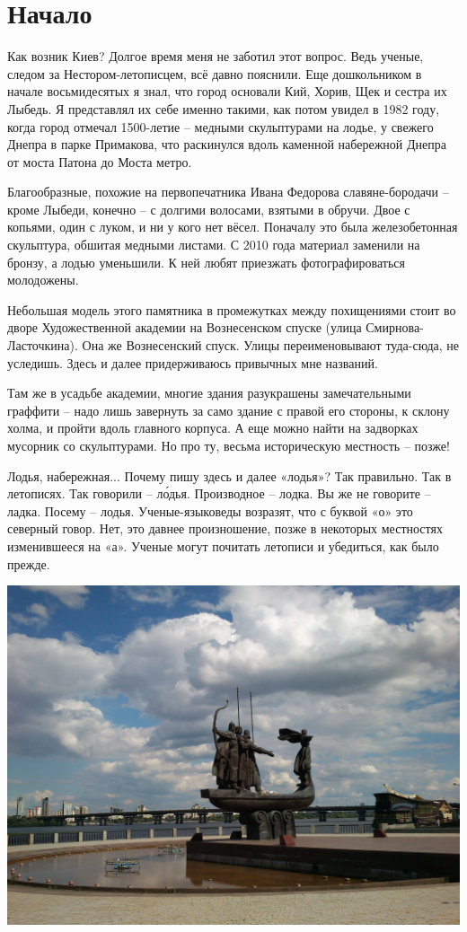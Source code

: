 \chapter{Начало}

Как возник Киев? Долгое время меня не заботил этот вопрос. Ведь ученые, следом за Нестором-летописцем, всё давно пояснили. Еще дошкольником в начале восьмидесятых я знал, что город основали Кий, Хорив, Щек и сестра их Лыбедь. Я представлял их себе именно такими, как потом увидел в 1982 году, когда город отмечал 1500-летие – медными  скульптурами на лодье, у свежего Днепра в парке Примакова, что раскинулся вдоль каменной набережной Днепра от моста Патона до Моста метро. 

Благообразные, похожие на первопечатника Ивана Федорова славяне-бородачи – кроме Лыбеди, конечно – с долгими волосами, взятыми в обручи. Двое с копьями, один с луком, и ни у кого нет вёсел. Поначалу это была железобетонная скульптура, обшитая медными листами. С 2010 года материал заменили на бронзу, а лодью уменьшили. К ней любят приезжать фотографироваться молодожены.

Небольшая модель этого памятника в промежутках между похищениями стоит во дворе Художественной академии на Вознесенском спуске (улица Смирнова-Ласточкина). Она же Вознесенский спуск. Улицы переименовывают туда-сюда, не уследишь. Здесь и далее придерживаюсь привычных мне названий. 

Там же в усадьбе академии, многие здания разукрашены замечательными граффити – надо лишь завернуть за само здание с правой его стороны, к склону холма, и пройти вдоль главного корпуса. А еще можно найти на задворках мусорник со скульптурами. Но про ту, весьма историческую местность – позже!

Лодья, набережная... Почему пишу здесь и далее «лодья»? Так правильно. Так в летописях. Так говорили – л\'одья. Производное – лодка. Вы же не говорите – ладка. Посему – лодья. Ученые-языковеды возразят, что с буквой «о» это северный говор. Нет, это давнее произношение, позже в некоторых местностях изменившееся на «а». Ученые могут почитать летописи и убедиться, как было прежде.

\begin{center}
\includegraphics[width=\linewidth]{chast-colebanie-osnov/nachalo/ladiya.jpg}
\end{center}

